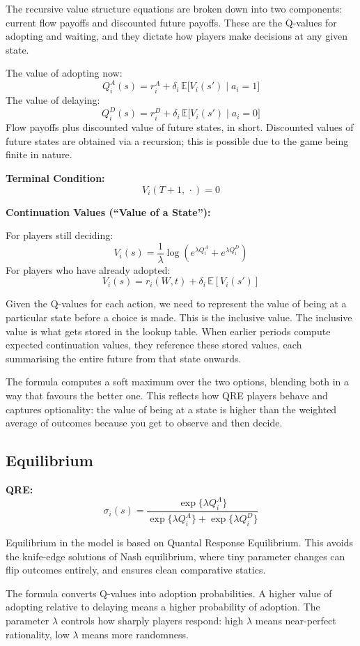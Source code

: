 \documentclass[12pt,a4paper]{article}
\begin{document}
The recursive value structure equations are broken down into two components: current flow payoffs and discounted future payoffs. These are the Q-values for adopting and waiting, and they dictate how players make decisions at any given state.

The value of adopting now:
\[
  Q_i^A(s) = r_i^A + \delta_i\,\mathbb{E}\bigl[V_i(s') \mid a_i = 1\bigr]
\]
The value of delaying:
\[
  Q_i^D(s) = r_i^D + \delta_i\,\mathbb{E}\bigl[V_i(s') \mid a_i = 0\bigr]
\]
Flow payoffs plus discounted value of future states, in short. Discounted values of future states are obtained via a recursion; this is possible due to the game being finite in nature.

\noindent\textbf{Terminal Condition:}
\[
  V_i(T+1,\,\cdot) = 0
\]

\noindent\textbf{Continuation Values (``Value of a State''):}

For players still deciding:
\[
  V_i(s) = \frac{1}{\lambda}\log\!\left(e^{\lambda Q_i^A} + e^{\lambda Q_i^D}\right)
\]
For players who have already adopted:
\[
  V_i(s) = r_i(W, t) + \delta_i\,\mathbb{E}[V_i(s')]
\]

Given the Q-values for each action, we need to represent the value of being at a particular state before a choice is made. This is the inclusive value. The inclusive value is what gets stored in the lookup table. When earlier periods compute expected continuation values, they reference these stored values, each summarising the entire future from that state onwards.

The formula computes a soft maximum over the two options, blending both in a way that favours the better one. This reflects how QRE players behave and captures optionality: the value of being at a state is higher than the weighted average of outcomes because you get to observe and then decide.

\subsection{Equilibrium}

\noindent\textbf{QRE:}
\[
  \sigma_i(s) = \frac{\exp\{\lambda Q_i^A\}}{\exp\{\lambda Q_i^A\} + \exp\{\lambda Q_i^D\}}
\]

Equilibrium in the model is based on Quantal Response Equilibrium. This avoids the knife-edge solutions of Nash equilibrium, where tiny parameter changes can flip outcomes entirely, and ensures clean comparative statics.

The formula converts Q-values into adoption probabilities. A higher value of adopting relative to delaying means a higher probability of adoption. The parameter $\lambda$ controls how sharply players respond: high $\lambda$ means near-perfect rationality, low $\lambda$ means more randomness.
\end{document}
